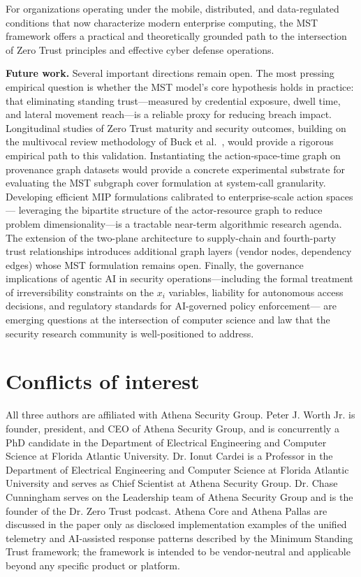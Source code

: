 \documentclass[unnumsec,webpdf,contemporary,large]{oup-authoring-template}
\theoremstyle{thmstyleone}
\theoremstyle{thmstyletwo}
\theoremstyle{thmstylethree}
\begin{document}
For organizations operating under the mobile, distributed, and data-regulated conditions
that now characterize modern enterprise computing, the MST framework offers a practical
and theoretically grounded path to the intersection of Zero Trust principles and effective
cyber defense operations.

\textbf{Future work.} Several important directions remain open. The most pressing empirical question is whether the MST model's core
hypothesis holds in practice: that eliminating standing trust---measured by
credential exposure, dwell time, and lateral movement reach---is a reliable
proxy for reducing breach impact.
Longitudinal studies of Zero Trust maturity and security outcomes,
building on the multivocal review methodology of Buck et al.\ \cite{buck2021},
would provide a rigorous empirical path to this validation.
Instantiating the action-space-time graph on provenance graph datasets
\cite{hassan2020provenance} would provide a concrete experimental substrate for
evaluating the MST subgraph cover formulation at system-call granularity.
Developing efficient MIP formulations calibrated to enterprise-scale action spaces---
leveraging the bipartite structure of the actor-resource graph to reduce problem
dimensionality---is a tractable near-term algorithmic research agenda. The
extension of the two-plane architecture to supply-chain and fourth-party trust
relationships introduces additional graph layers (vendor nodes, dependency edges)
whose MST formulation remains open. Finally, the governance implications of
agentic AI in security operations---including the formal treatment of
irreversibility constraints on the $x_i$ variables, liability for autonomous
access decisions, and regulatory standards for AI-governed policy enforcement---
are emerging questions at the intersection of computer science and law that the
security research community is well-positioned to address.



\section{Conflicts of interest}
All three authors are affiliated with Athena Security Group. Peter J. Worth Jr. is founder, president, and CEO of Athena Security Group, and is concurrently a PhD candidate in the Department of Electrical Engineering and Computer Science at Florida Atlantic University. Dr. Ionut Cardei is a Professor in the Department of Electrical Engineering and Computer Science at Florida Atlantic University and serves as Chief Scientist at Athena Security Group. Dr. Chase Cunningham serves on the Leadership team of Athena Security Group and is the founder of the Dr. Zero Trust podcast. Athena Core and Athena Pallas are discussed in the paper only as disclosed implementation examples of the unified telemetry and AI-assisted response patterns described by the Minimum Standing Trust framework; the framework is intended to be vendor-neutral and applicable beyond any specific product or platform.
\end{document}
